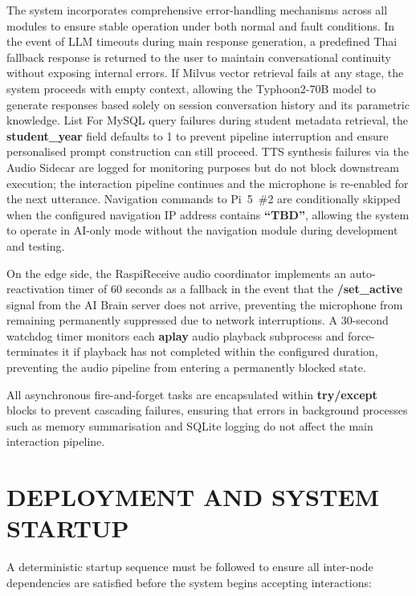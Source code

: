 The system incorporates comprehensive error-handling mechanisms across all modules to ensure stable operation under both normal and fault conditions. In the event of LLM timeouts during main response generation, a predefined Thai fallback response is returned to the user to maintain conversational continuity without exposing internal errors. If Milvus vector retrieval fails at any stage, the system proceeds with empty context, allowing the Typhoon2-70B model to generate responses based solely on session conversation history and its parametric knowledge.
List
For MySQL query failures during student metadata retrieval, the \textbf{student\_year} field defaults to 1 to prevent pipeline interruption and ensure personalised prompt construction can still proceed. TTS synthesis failures via the Audio Sidecar are logged for monitoring purposes but do not block downstream execution; the interaction pipeline continues and the microphone is re-enabled for the next utterance. Navigation commands to Pi~5~\#2 are conditionally skipped when the configured navigation IP address contains \textbf{``TBD''}, allowing the system to operate in AI-only mode without the navigation module during development and testing.

On the edge side, the RaspiReceive audio coordinator implements an auto-reactivation timer of 60 seconds as a fallback in the event that the \textbf{/set\_active} signal from the AI Brain server does not arrive, preventing the microphone from remaining permanently suppressed due to network interruptions. A 30-second watchdog timer monitors each \textbf{aplay} audio playback subprocess and force-terminates it if playback has not completed within the configured duration, preventing the audio pipeline from entering a permanently blocked state.

All asynchronous fire-and-forget tasks are encapsulated within \textbf{try/except} blocks to prevent cascading failures, ensuring that errors in background processes such as memory summarisation and SQLite logging do not affect the main interaction pipeline.

\section{DEPLOYMENT AND SYSTEM STARTUP}

A deterministic startup sequence must be followed to ensure all inter-node dependencies are satisfied before the system begins accepting interactions:

